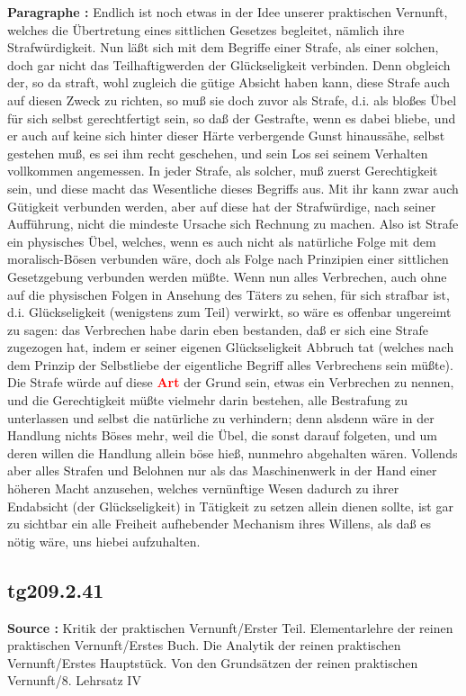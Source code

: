 \documentclass[a4paper,12pt,twoside]{book}
\newcommand{\match}[1]{\textcolor{red}{\textbf{#1}}}
\begin{document}
	\noindent\textbf{Paragraphe : }Endlich ist noch etwas in der Idee unserer praktischen Vernunft, welches die Übertretung eines sittlichen Gesetzes begleitet, nämlich ihre Strafwürdigkeit. Nun läßt sich mit dem Begriffe einer Strafe, als einer solchen, doch gar nicht das Teilhaftigwerden der Glückseligkeit verbinden. Denn obgleich der, so da straft, wohl zugleich die gütige Absicht haben kann, diese Strafe auch auf diesen Zweck zu richten, so muß sie doch zuvor als Strafe, d.i. als bloßes Übel für sich selbst gerechtfertigt sein, so daß der Gestrafte, wenn es dabei bliebe, und er auch auf keine sich hinter dieser Härte verbergende Gunst hinaussähe, selbst gestehen muß, es sei ihm recht geschehen, und sein Los sei seinem Verhalten vollkommen angemessen. In jeder Strafe, als solcher, muß zuerst Gerechtigkeit sein, und diese macht das Wesentliche dieses Begriffs aus. Mit ihr kann zwar auch Gütigkeit verbunden werden, aber auf diese hat der Strafwürdige, nach seiner Aufführung, nicht die mindeste Ursache sich Rechnung zu machen. Also ist Strafe ein physisches Übel, welches, wenn es auch nicht als natürliche Folge mit dem moralisch-Bösen verbunden wäre, doch als Folge nach Prinzipien einer sittlichen Gesetzgebung verbunden werden müßte. Wenn nun alles Verbrechen, auch ohne auf die physischen Folgen in Ansehung des Täters zu sehen, für sich strafbar ist, d.i. Glückseligkeit (wenigstens zum Teil) verwirkt, so wäre es offenbar ungereimt zu sagen: das Verbrechen habe darin eben bestanden, daß er sich eine Strafe zugezogen hat, indem er seiner eigenen Glückseligkeit Abbruch tat (welches nach dem Prinzip der Selbstliebe der eigentliche Begriff alles Verbrechens sein müßte). Die Strafe würde auf diese \match{Art} der Grund sein, etwas ein Verbrechen  zu nennen, und die Gerechtigkeit müßte vielmehr darin bestehen, alle Bestrafung zu unterlassen und selbst die natürliche zu verhindern; denn alsdenn wäre in der Handlung nichts Böses mehr, weil die Übel, die sonst darauf folgeten, und um deren willen die Handlung allein böse hieß, nunmehro abgehalten wären. Vollends aber alles Strafen und Belohnen nur als das Maschinenwerk in der Hand einer höheren Macht anzusehen, welches vernünftige Wesen dadurch zu ihrer Endabsicht (der Glückseligkeit) in Tätigkeit zu setzen allein dienen sollte, ist gar zu sichtbar ein alle Freiheit aufhebender Mechanism ihres Willens, als daß es nötig wäre, uns hiebei aufzuhalten. 
	
	\subsection*{tg209.2.41} 
	\textbf{Source : }Kritik der praktischen Vernunft/Erster Teil. Elementarlehre der reinen praktischen Vernunft/Erstes Buch. Die Analytik der reinen praktischen Vernunft/Erstes Hauptstück. Von den Grundsätzen der reinen praktischen Vernunft/8. Lehrsatz IV\\  
	
\end{document}
